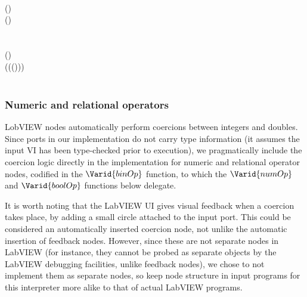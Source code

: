 \begin{hscode}
\\
\>[B]{}\<[4]%
\>[4]{}\<[E]%
\\
\>[4]{}\<[7]%
\>[7]{}\mathrel{=}{}\<[E]%
\\
\>[7]{}\<[10]%
\>[10]{}\;(\;){}\<[E]%
\\
\>[4]{}\<[7]%
\>[7]{}\;(\;\mathbin{:}\;\mathbin{:})\mathrel{=}{}\<[E]%
\\
\>[7]{}\<[10]%
\>[10]{}\<[E]%
\\
\>[7]{}\<[10]%
\>[10]{}\;\;\mathrel{=}{}\<[30]%
\>[30]{}\;\;\<[E]%
\\
\>[30]{}\;(\mathbin{-}){}\<[E]%
\\
\>[30]{}\;(\lambda (\;(\;))\to {})\;\<[E]%
\\
\>[4]{}\<[7]%
\>[7]{}\;\mathrel{=}{}\<[E]%
\\
\>[7]{}\<[10]%
\>[10]{}\<[E]%
\ColumnHook
\end{hscode}\resethooks

\subsubsection{Numeric and relational operators}
\label{binop}

LobVIEW nodes automatically perform coercions between integers and doubles.
Since ports in our implementation do not carry type information (it assumes
the input VI has been type-checked prior to execution), we pragmatically
include the coercion logic directly in the implementation for numeric and
relational operator nodes, codified in the \ensuremath{\Varid{binOp}} function, to which the
\ensuremath{\Varid{numOp}} and \ensuremath{\Varid{boolOp}} functions below delegate.

It is worth noting that the LabVIEW UI gives visual feedback when a coercion
takes place, by adding a small circle attached to the input port. This could
be considered an automatically inserted coercion node, not unlike the automatic
insertion of feedback nodes. However, since these are not separate nodes in
LabVIEW (for instance, they cannot be probed as separate objects by the
LabVIEW debugging facilities, unlike feedback nodes), we chose to not implement
them as separate nodes, so keep node structure in input programs for this
interpreter more alike to that of actual LabVIEW programs.


